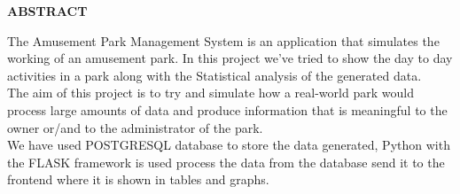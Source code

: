 \pagestyle{empty}
\begin{center}
\textup{\large{\textbf{ABSTRACT}}}
\end{center}
\justify
\indent
The Amusement Park Management System is an application that simulates the working of an amusement park. In this project we've tried to show the day to day activities in a park along with the Statistical analysis of the generated data.\\

The aim of this project is to try and simulate how a real-world park would process large amounts of data and produce information that is meaningful to the owner or/and to the administrator of the park.\\

We have used POSTGRESQL database to store the data generated, Python with the FLASK framework is used process the data from the database send it to the frontend where it is shown in tables and graphs.
\pagebreak
